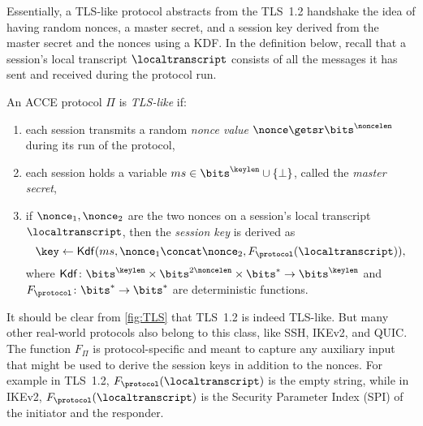 Essentially,
a TLS-like protocol abstracts from the TLS~1.2 handshake the idea of having random nonces,
a master secret,
and a session key derived from the master secret and the nonces using a KDF.
In the definition below,
recall that a session's local transcript $\localtranscript$ consists of all the messages it has sent and received during the protocol run.


\begin{definition}\label{def:TLS-like}
An ACCE protocol $\Pi$ is \emph{TLS-like} if:
\begin{enumerate}[label=(\roman*),ref=\ref*{def:TLS-like}.\roman*]
	\item\label{def:TLS-like:nonces_generated_and_sent} each session transmits a random \emph{nonce value} $\nonce \getsr \bits^\noncelen$ during its run of the protocol,
	
	\item\label{def:TLS-like:ms_variable_present} each session holds a variable $ms \in \bits^\keylen \cup \lbrace \bot \rbrace$, called the \emph{master secret},
	
	\item\label{def:TLS-like:kdf_use_ms_and_nonces} if $\nonce_1, \nonce_2$ are the two nonces on a session's local transcript $\localtranscript$,
	then the \emph{session key} is derived as 
	\begin{equation}\label{eq:TLS-like:key-derivation}
		\key \gets \mathsf{Kdf}(ms, \nonce_1 \concat \nonce_2, F_{\protocol}(\localtranscript)), 
	\end{equation}
	where $\mathsf{Kdf} \colon \bits^\keylen \times \bits^{2\noncelen} \times \bits^* \to \bits^\keylen$ and $F_{\protocol} \colon \bits^* \to \bits^*$  are deterministic functions.
\end{enumerate}

\end{definition}


It should be clear from \cref{fig:TLS} that TLS~1.2 is indeed TLS-like.
But many other real-world protocols also belong to this class,
like SSH, IKEv2, and QUIC.
The function $F_{\Pi}$ is protocol-specific and meant to capture any auxiliary input that might be used to derive the session keys in addition to the nonces.
For example in TLS~1.2, $F_{\protocol}(\localtranscript)$ is the empty string, 
while in IKEv2, $F_{\protocol}(\localtranscript)$ is the Security Parameter Index (SPI) of the initiator and the responder.





